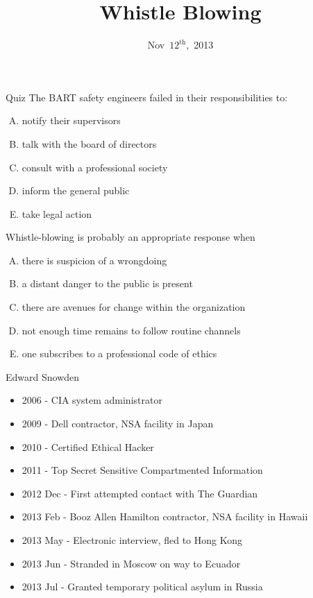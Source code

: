 \documentclass{beamer}
\title{Whistle Blowing}
\date{Nov~$12^{\text{th}}$,~2013}
\begin{document}
\begin{frame}
\titlepage
\end{frame}

\begin{frame}{Quiz}
The BART safety engineers failed in their responsibilities to:
\begin{enumerate}[(A)]
\item<1> notify their supervisors
\item<1> talk with the board of directors
\item<1> consult with a professional society
\item<1> inform the general public
\item<1-2> take legal action
\end{enumerate}
\bigskip
Whistle-blowing is probably an appropriate response when
\begin{enumerate}[(A)]
\item<1> there is suspicion of a wrongdoing
\item<1> a distant danger to the public is present
\item<1> there are avenues for change within the organization
\item<1-2> not enough time remains to follow routine channels
\item<1> one subscribes to a professional code of ethics
\end{enumerate}
\end{frame}

\begin{frame}{Edward Snowden}
\begin{itemize}
\item 2006 - CIA system administrator
\item 2009 - Dell contractor, NSA facility in Japan
\item 2010 - Certified Ethical Hacker
\item 2011 - Top Secret Sensitive Compartmented Information
\item 2012 Dec - First attempted contact with The Guardian
\item 2013 Feb - Booz Allen Hamilton contractor, NSA facility in Hawaii
\item 2013 May - Electronic interview, fled to Hong Kong
\item 2013 Jun - Stranded in Moscow on way to Ecuador
\item 2013 Jul - Granted temporary political asylum in Russia
\end{itemize}
\end{frame}
\end{document}

